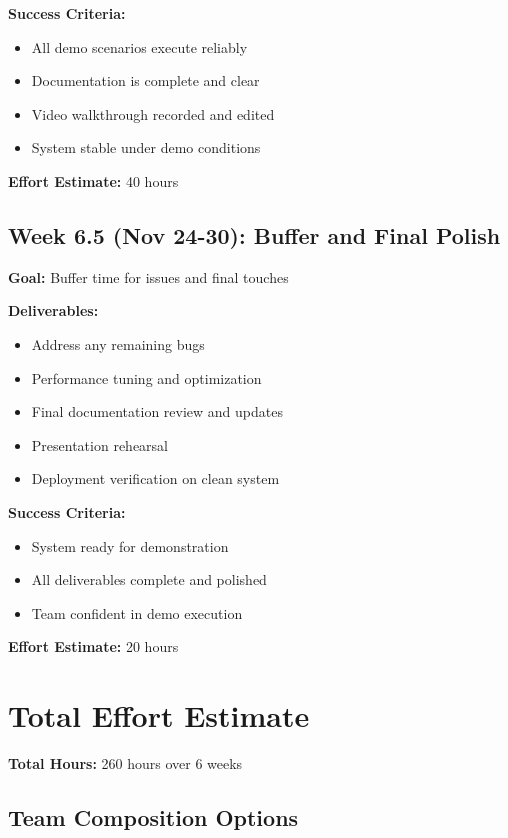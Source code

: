 \documentclass[12pt,a4paper]{article}
\begin{document}
\textbf{Success Criteria:}
\begin{itemize}[leftmargin=1cm,itemsep=0pt]
    \item All demo scenarios execute reliably
    \item Documentation is complete and clear
    \item Video walkthrough recorded and edited
    \item System stable under demo conditions
\end{itemize}

\textbf{Effort Estimate:} 40 hours

\subsection{Week 6.5 (Nov 24-30): Buffer and Final Polish}

\textbf{Goal:} Buffer time for issues and final touches

\textbf{Deliverables:}
\begin{itemize}[leftmargin=1cm,itemsep=0pt]
    \item Address any remaining bugs
    \item Performance tuning and optimization
    \item Final documentation review and updates
    \item Presentation rehearsal
    \item Deployment verification on clean system
\end{itemize}

\textbf{Success Criteria:}
\begin{itemize}[leftmargin=1cm,itemsep=0pt]
    \item System ready for demonstration
    \item All deliverables complete and polished
    \item Team confident in demo execution
\end{itemize}

\textbf{Effort Estimate:} 20 hours

\section{Total Effort Estimate}

\textbf{Total Hours:} 260 hours over 6 weeks

\subsection{Team Composition Options}
\end{document}
